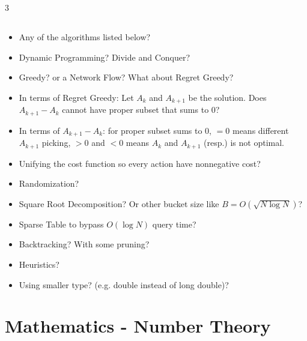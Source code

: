 \documentclass[landscape, 8pt, a4paper, oneside]{extarticle}
\begin{document}
\begin{multicols*}{3}
\subsection{}
\begin{itemize}
	\item Any of the algorithms listed below?
	\item Dynamic Programming? Divide and Conquer?
	\item Greedy? or a Network Flow? What about Regret Greedy?
	\item In terms of Regret Greedy: Let $A_k$ and $A_{k+1}$ be the solution. Does $A_{k+1} - A_k$ cannot have proper subset that sums to $0$?
	\item In terms of $A_{k+1} - A_k$: for proper subset sums to $0$, $= 0$ means different $A_{k+1}$ picking, $> 0$ and $< 0$ means $A_k$ and $A_{k+1}$ (resp.) is not optimal.
	\item Unifying the cost function so every action have nonnegative cost?
	\item Randomization?
	\item Square Root Decomposition? Or other bucket size like $B = O(\sqrt{N \log N})$?
	\item Sparse Table to bypass $O(\log N)$ query time?
	\item Backtracking? With some pruning?
	\item Heuristics?
	\item Using smaller type? (e.g. double instead of long double)?
\end{itemize}
\section{Mathematics - Number Theory}

\end{multicols*}
\end{document}
